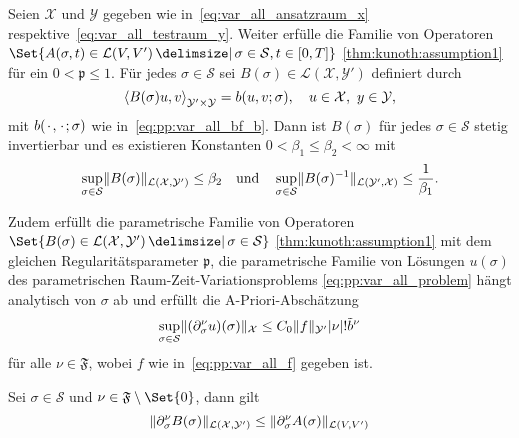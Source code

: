 \begin{Satz}
\label{thm:kunoth:theorem21}
    Seien $\mathcal X$ und $\mathcal Y$ gegeben wie in~\cref{eq:var_all_ansatzraum_x} respektive~\cref{eq:var_all_testraum_y}.
    Weiter erfülle die Familie von Operatoren $\Set{ A(\sigma, t) \in \mathcal L(V, V') \given \sigma \in \mathcal S, t \in [0, T] }$ \cref{thm:kunoth:assumption1} für ein $0 < \mathfrak p \leq 1$.
    Für jedes $\sigma \in \mathcal S$ sei $B(\sigma) \in \mathcal L(\mathcal X, \mathcal Y')$ definiert durch
    \begin{equation}
        \label{eq:var_all_gross_b_parametrisch}
        \left\langle B(\sigma) u,v\right\rangle_{\mathcal Y' \times \mathcal Y} = b(u, v; \sigma), \quad u \in \mathcal X,~y \in \mathcal Y,
    \end{equation}
    mit $b({\mkern2mu\cdot\mkern2mu}, {\mkern2mu\cdot\mkern2mu}; \sigma)$ wie in~\cref{eq:pp:var_all_bf_b}.
    Dann ist $B(\sigma)$ für jedes $\sigma \in \mathcal S$ stetig invertierbar und es existieren Konstanten $0 < \beta_{1} \leq \beta_{2} < \infty$ mit
    \begin{equation}
        \label{eq:var_all_norm_B_und_B_inv_parametrisch}
        \sup_{\sigma \in \mathcal S} \lVert B(\sigma)\rVert_{\mathcal L(\mathcal X, \mathcal Y')} \leq \beta_{2} \quad \text{und} \quad  \sup_{\sigma \in \mathcal S} \lVert B(\sigma)^{-1}\rVert_{\mathcal L(\mathcal Y', \mathcal X)} \leq \frac{1}{\beta_{1}}.
    \end{equation}

    Zudem erfüllt die parametrische Familie von Operatoren $\Set{ B(\sigma) \in \mathcal L(\mathcal X, \mathcal Y') \given \sigma \in \mathcal S }$ \cref{thm:kunoth:assumption1} mit dem gleichen Regularitätsparameter $\mathfrak p$, die parametrische Familie von Lösungen $u(\sigma)$ des parametrischen Raum-Zeit-Variationsproblems \cref{eq:pp:var_all_problem} hängt analytisch von $\sigma$ ab und erfüllt die A-Priori-Abschätzung
    \begin{equation}
        \label{eq:var_all_a_priori_schranke}
        \sup_{\sigma \in \mathcal S} \lVert(\partial^{\nu}_{\sigma} u)(\sigma)\rVert_{\mathcal X} \leq C_{0} \lVert f\rVert_{\mathcal Y'} \lvert\nu\rvert! \tilde{b}^{\nu}
    \end{equation}
    für alle $\nu \in \mathfrak F$, wobei $f$ wie in~\cref{eq:pp:var_all_f} gegeben ist.
\end{Satz}

\begin{Lemma}
\label{lemma:norm_B_beschraenkt_durch_norm_A}
    Sei $\sigma \in \mathcal S$ und $\nu \in \mathfrak F \setminus \Set{ 0 }$, dann gilt
    \begin{equation}
        \lVert\partial^{\nu}_{\sigma} B(\sigma)\rVert_{\mathcal L(\mathcal X, \mathcal Y')}
        \leq
        \lVert\partial^{\nu}_{\sigma} A(\sigma)\rVert_{\mathcal L(V, V')}
    \end{equation}

    \begin{Beweis}
    \end{Beweis}
\end{Lemma}

